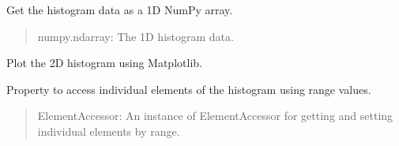 \documentclass[letterpaper,10pt,english]{sphinxmanual}
\begin{document}
\begin{fulllineitems}
\begin{fulllineitems}
\begin{quote}
\begin{description}
\end{description}\end{quote}

\end{fulllineitems}


\begin{fulllineitems}
\label{\detokenize{HF:Histogram.Histogram2D.histogram_1d}}
\pysigstartsignatures
{}
\pysigstopsignatures
\sphinxAtStartPar
Get the histogram data as a 1D NumPy array.
\begin{quote}\begin{description}
\sphinxAtStartPar
numpy.ndarray: The 1D histogram data.

\end{description}\end{quote}

\end{fulllineitems}


\begin{fulllineitems}
\label{\detokenize{HF:Histogram.Histogram2D.plot_histogram}}
\pysigstartsignatures
{}
\pysigstopsignatures
\sphinxAtStartPar
Plot the 2D histogram using Matplotlib.

\end{fulllineitems}


\begin{fulllineitems}
\label{\detokenize{HF:Histogram.Histogram2D.element}}
\pysigstartsignatures
{}
\pysigstopsignatures
\sphinxAtStartPar
Property to access individual elements of the histogram using range values.
\begin{quote}\begin{description}
\sphinxAtStartPar
ElementAccessor: An instance of ElementAccessor for getting and setting individual elements by range.

\end{description}\end{quote}

\end{fulllineitems}


\end{fulllineitems}
\end{document}
